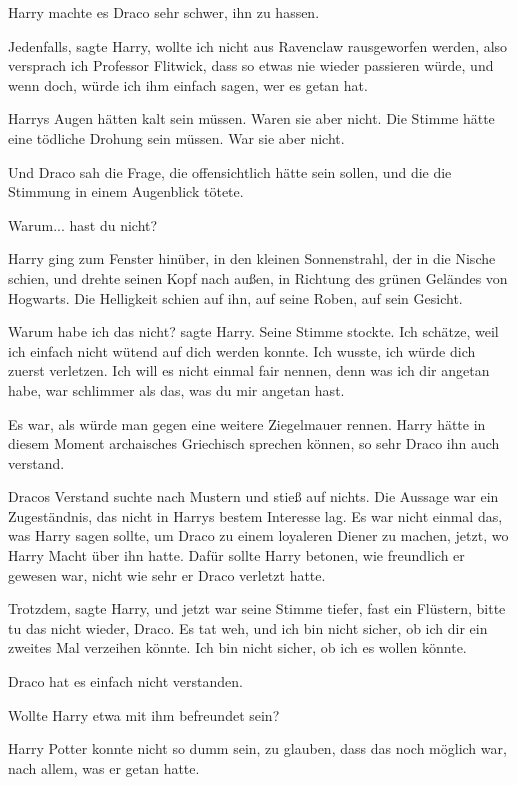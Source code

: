 Harry machte es Draco sehr schwer, ihn zu hassen.

\glqq{}Jedenfalls\grqq{}, sagte Harry, \glqq{}wollte ich nicht aus Ravenclaw
rausgeworfen werden, also versprach ich Professor Flitwick, dass so etwas nie
wieder passieren würde, und wenn doch, würde ich ihm einfach sagen, wer es getan
hat.\grqq{}

Harrys Augen hätten kalt sein müssen. Waren sie aber nicht. Die Stimme hätte
eine tödliche Drohung sein müssen. War sie aber nicht.

Und Draco sah die Frage, die offensichtlich hätte sein sollen, und die die
Stimmung in einem Augenblick tötete.

\glqq{}Warum... hast du nicht?\grqq{}

Harry ging zum Fenster hinüber, in den kleinen Sonnenstrahl, der in die Nische
schien, und drehte seinen Kopf nach außen, in Richtung des grünen Geländes von
Hogwarts. Die Helligkeit schien auf ihn, auf seine Roben, auf sein Gesicht.

\glqq{}Warum habe ich das nicht?\grqq{} sagte Harry. Seine Stimme stockte. \glqq{}
Ich schätze, weil ich einfach nicht wütend auf dich werden konnte. Ich wusste,
ich würde dich zuerst verletzen. Ich will es nicht einmal fair nennen, denn was
ich dir angetan habe, war schlimmer als das, was du mir angetan hast.\grqq{}

Es war, als würde man gegen eine weitere Ziegelmauer rennen. Harry hätte in
diesem Moment archaisches Griechisch sprechen können, so sehr Draco ihn auch
verstand.

Dracos Verstand suchte nach Mustern und stieß auf nichts. Die Aussage war ein
Zugeständnis, das nicht in Harrys bestem Interesse lag. Es war nicht einmal das,
was Harry sagen sollte, um Draco zu einem loyaleren Diener zu machen, jetzt, wo
Harry Macht über ihn hatte. Dafür sollte Harry betonen, wie freundlich er
gewesen war, nicht wie sehr er Draco verletzt hatte.

\glqq{}Trotzdem\grqq{}, sagte Harry, und jetzt war seine Stimme tiefer, fast ein
Flüstern, \glqq{}bitte tu das nicht wieder, Draco. Es tat weh, und ich bin nicht
sicher, ob ich dir ein zweites Mal verzeihen könnte. Ich bin nicht sicher, ob
ich es wollen könnte.\grqq{}

Draco hat es einfach nicht verstanden.

Wollte Harry etwa mit ihm befreundet sein?

Harry Potter konnte nicht so dumm sein, zu glauben, dass das noch möglich war,
nach allem, was er getan hatte.

